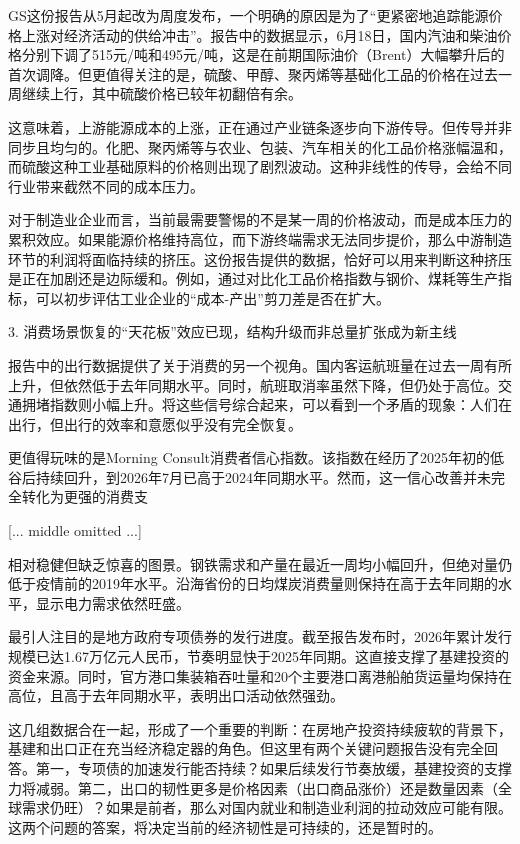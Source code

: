 \documentclass[11pt]{ctexart}
\begin{document}
GS这份报告从5月起改为周度发布，一个明确的原因是为了“更紧密地追踪能源价格上涨对经济活动的供给冲击”。报告中的数据显示，6月18日，国内汽油和柴油价格分别下调了515元/吨和495元/吨，这是在前期国际油价（Brent）大幅攀升后的首次调降。但更值得关注的是，硫酸、甲醇、聚丙烯等基础化工品的价格在过去一周继续上行，其中硫酸价格已较年初翻倍有余。

这意味着，上游能源成本的上涨，正在通过产业链条逐步向下游传导。但传导并非同步且均匀的。化肥、聚丙烯等与农业、包装、汽车相关的化工品价格涨幅温和，而硫酸这种工业基础原料的价格则出现了剧烈波动。这种非线性的传导，会给不同行业带来截然不同的成本压力。

对于制造业企业而言，当前最需要警惕的不是某一周的价格波动，而是成本压力的累积效应。如果能源价格维持高位，而下游终端需求无法同步提价，那么中游制造环节的利润将面临持续的挤压。这份报告提供的数据，恰好可以用来判断这种挤压是正在加剧还是边际缓和。例如，通过对比化工品价格指数与钢价、煤耗等生产指标，可以初步评估工业企业的“成本-产出”剪刀差是否在扩大。

3. 消费场景恢复的“天花板”效应已现，结构升级而非总量扩张成为新主线

报告中的出行数据提供了关于消费的另一个视角。国内客运航班量在过去一周有所上升，但依然低于去年同期水平。同时，航班取消率虽然下降，但仍处于高位。交通拥堵指数则小幅上升。将这些信号综合起来，可以看到一个矛盾的现象：人们在出行，但出行的效率和意愿似乎没有完全恢复。

更值得玩味的是Morning Consult消费者信心指数。该指数在经历了2025年初的低谷后持续回升，到2026年7月已高于2024年同期水平。然而，这一信心改善并未完全转化为更强的消费支

[... middle omitted ...]

相对稳健但缺乏惊喜的图景。钢铁需求和产量在最近一周均小幅回升，但绝对量仍低于疫情前的2019年水平。沿海省份的日均煤炭消费量则保持在高于去年同期的水平，显示电力需求依然旺盛。

最引人注目的是地方政府专项债券的发行进度。截至报告发布时，2026年累计发行规模已达1.67万亿元人民币，节奏明显快于2025年同期。这直接支撑了基建投资的资金来源。同时，官方港口集装箱吞吐量和20个主要港口离港船舶货运量均保持在高位，且高于去年同期水平，表明出口活动依然强劲。

这几组数据合在一起，形成了一个重要的判断：在房地产投资持续疲软的背景下，基建和出口正在充当经济稳定器的角色。但这里有两个关键问题报告没有完全回答。第一，专项债的加速发行能否持续？如果后续发行节奏放缓，基建投资的支撑力将减弱。第二，出口的韧性更多是价格因素（出口商品涨价）还是数量因素（全球需求仍旺）？如果是前者，那么对国内就业和制造业利润的拉动效应可能有限。这两个问题的答案，将决定当前的经济韧性是可持续的，还是暂时的。
\end{document}
